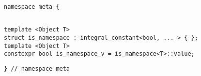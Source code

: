 
\begin{verbatim}
namespace meta {
\end{verbatim}
\begin{verbatim}

template <Object T>
struct is_namespace : integral_constant<bool, ... > { };
template <Object T>
constexpr bool is_namespace_v = is_namespace<T>::value;

\end{verbatim}
\begin{verbatim}
} // namespace meta
\end{verbatim}
